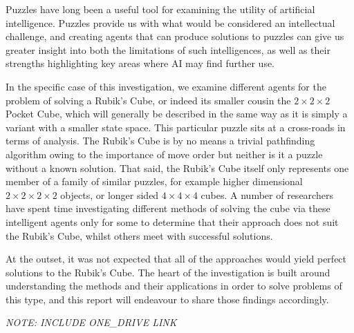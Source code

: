 \documentclass[UKenglish]{svproc}
\begin{document}
Puzzles have long been a useful tool for examining the utility of artificial intelligence. Puzzles provide us with what would be considered an intellectual challenge, and creating agents that can produce solutions to puzzles can give us greater insight into both the limitations of such intelligences, as well as their strengths highlighting key areas where AI may find further use.

In the specific case of this investigation, we examine different agents for the problem of solving a Rubik's Cube, or indeed its smaller cousin the $2\times 2\times 2$ Pocket Cube, which will generally be described in the same way as it is simply a variant with a smaller state space. This particular puzzle sits at a cross-roads in terms of analysis. The Rubik's Cube is by no means a trivial pathfinding algorithm owing to the importance of move order but neither is it a puzzle without a known solution. That said, the Rubik's Cube itself only represents one member of a family of similar puzzles, for example higher dimensional $2\times 2\times 2\times 2$ objects, or longer sided $4\times 4\times 4$ cubes. A number of researchers have spent time investigating different methods of solving the cube via these intelligent agents only for some to determine that their approach does not suit the Rubik's Cube, whilst others meet with successful solutions.

At the outset, it was not expected that all of the approaches would yield perfect solutions to the Rubik's Cube. The heart of the investigation is built around understanding the methods and their applications in order to solve problems of this type, and this report will endeavour to share those findings accordingly.

\emph{NOTE: INCLUDE ONE\_DRIVE LINK}

\end{document}
